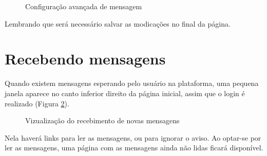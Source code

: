 \begin{figure}[htbp]
 \begin{center}
  \caption{Configuração avançada de mensagem}
  \label{fig:cap2_13}
 \end{center}
\end{figure}

Lembrando que será necessário salvar as modicações no final da página.

\section{Recebendo mensagens}
Quando existem mensagens esperando pelo usuário na plataforma, uma pequena janela aparece no canto inferior direito da página inicial, assim que o login é realizado (Figura \ref{fig:cap2_14}).

\begin{figure}[htbp]
 \begin{center}
  \caption{Vizualização do recebimento de novas mensagens}
  \label{fig:cap2_14}
 \end{center}
\end{figure}

Nela haverá links para ler as mensagens, ou para ignorar o aviso.
Ao optar-se por ler as mensagens, uma página com as mensagens ainda não lidas ficará disponível.


 \begin{center}
 \end{center}


